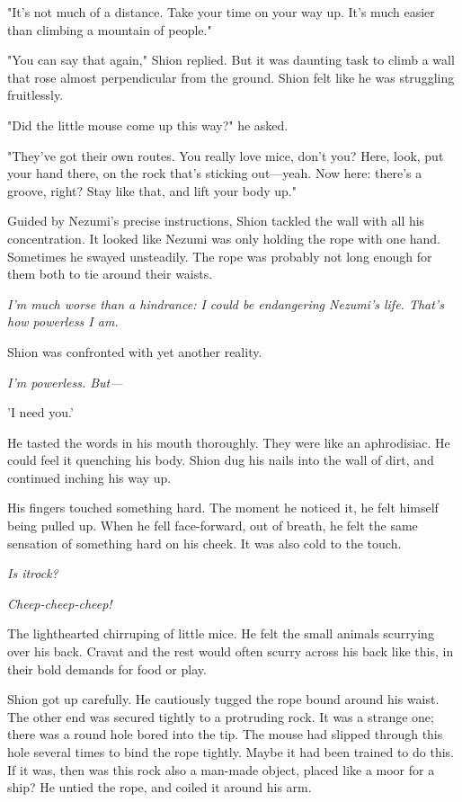 "It's not much of a distance. Take your time on your way up. It's much
easier than climbing a mountain of people."

"You can say that again," Shion replied. But it was daunting task to
climb a wall that rose almost perpendicular from the ground. Shion felt
like he was struggling fruitlessly.

"Did the little mouse come up this way?" he asked.

"They've got their own routes. You really love mice, don't you? Here,
look, put your hand there, on the rock that's sticking out---yeah. Now
here: there's a groove, right? Stay like that, and lift your body up."

Guided by Nezumi's precise instructions, Shion tackled the wall with all
his concentration. It looked like Nezumi was only holding the rope with
one hand. Sometimes he swayed unsteadily. The rope was probably not long
enough for them both to tie around their waists.

\emph{I'm much worse than a hindrance: I could be endangering Nezumi's life.
That's how powerless I am.}

Shion was confronted with yet another reality.

\emph{I'm powerless. But---}

'I need you.'

He tasted the words in his mouth thoroughly. They were like an
aphrodisiac. He could feel it quenching his body. Shion dug his nails
into the wall of dirt, and continued inching his way up.

\mybreak

His fingers touched something hard. The moment he noticed it, he felt
himself being pulled up. When he fell face-forward, out of breath, he
felt the same sensation of something hard on his cheek. It was also cold
to the touch.

\emph{Is it\el rock?}

\emph{Cheep-cheep-cheep!}

The lighthearted chirruping of little mice. He felt the small animals
scurrying over his back. Cravat and the rest would often scurry across
his back like this, in their bold demands for food or play.

Shion got up carefully. He cautiously tugged the rope bound around his
waist. The other end was secured tightly to a protruding rock. It was a
strange one; there was a round hole bored into the tip. The mouse had
slipped through this hole several times to bind the rope tightly. Maybe
it had been trained to do this. If it was, then was this rock also a
man-made object, placed like a moor for a ship? He untied the rope, and
coiled it around his arm.

